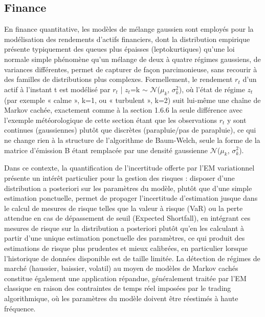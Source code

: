 \subsection{Finance}
En finance quantitative, les modèles de mélange gaussien sont employés pour la modélisation des rendements d'actifs financiers, dont la distribution empirique présente typiquement des queues plus épaisses (leptokurtiques) qu'une loi normale simple  phénomène qu'un mélange de deux à quatre régimes gaussiens, de variances différentes, permet de capturer de façon parcimonieuse, sans recourir à des familles de distributions plus complexes. Formellement, le rendement $r_{t}$ d'un actif à l'instant t est modélisé par $r_{t}$ | $z_{t}$=k $\sim $ $\mathcal{N}$($\mu _{k}$, $\sigma _{k}^{2}$), où l'état de régime $z_{t}$ (par exemple « calme », k=1, ou « turbulent », k=2) suit lui-même une chaîne de Markov cachée, exactement comme à la section 1.6.6  la seule différence avec l'exemple météorologique de cette section étant que les observations $r_{t}$ y sont continues (gaussiennes) plutôt que discrètes (parapluie/pas de parapluie), ce qui ne change rien à la structure de l'algorithme de Baum-Welch, seule la forme de la matrice d'émission B étant remplacée par une densité gaussienne $\mathcal{N}$($\mu _{k}$, $\sigma _{k}^{2}$).

Dans ce contexte, la quantification de l'incertitude offerte par l'EM variationnel présente un intérêt particulier pour la gestion des risques : disposer d'une distribution a posteriori sur les paramètres du modèle, plutôt que d'une simple estimation ponctuelle, permet de propager l'incertitude d'estimation jusque dans le calcul de mesures de risque telles que la valeur à risque (VaR) ou la perte attendue en cas de dépassement de seuil (Expected Shortfall), en intégrant ces mesures de risque sur la distribution a posteriori plutôt qu'en les calculant à partir d'une unique estimation ponctuelle des paramètres, ce qui produit des estimations de risque plus prudentes et mieux calibrées, en particulier lorsque l'historique de données disponible est de taille limitée. La détection de régimes de marché (haussier, baissier, volatil) au moyen de modèles de Markov cachés constitue également une application répandue, généralement traitée par l'EM classique en raison des contraintes de temps réel imposées par le trading algorithmique, où les paramètres du modèle doivent être réestimés à haute fréquence.

